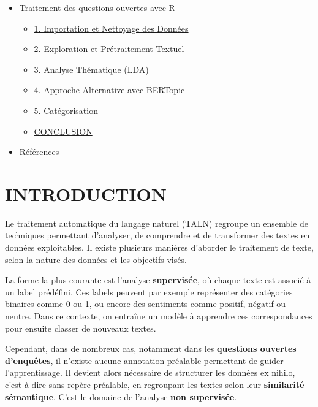 \documentclass[
]{article}
\providecommand{\tightlist}{%
  \setlength{\itemsep}{0pt}\setlength{\parskip}{0pt}}
\begin{document}
\begin{itemize}
\tightlist
\item
  \hyperref[analyse-textuelle-reponses-enquete]{Traitement des questions
  ouvertes avec R}

  \begin{itemize}
  \tightlist
  \item
    \hyperref[importation-nettoyage-donnees]{1. Importation et Nettoyage
    des Données}
  \item
    \hyperref[exploration-pretraitement-textuel]{2. Exploration et
    Prétraitement Textuel}
  \item
    \hyperref[analyse-thematique-lda]{3. Analyse Thématique (LDA)}
  \item
    \hyperref[approche-alternative-bertopic]{4. Approche Alternative
    avec BERTopic}
  \item
    \hyperref[visualisation]{5. Catégorisation}
  \item
    \hyperref[conclusion]{CONCLUSION}
  \end{itemize}
\item
  \hyperref[references-webographiques]{Références}
\end{itemize}

\newpage

\section{INTRODUCTION}\label{sec:importation}

Le traitement automatique du langage naturel (TALN) regroupe un ensemble
de techniques permettant d'analyser, de comprendre et de transformer des
textes en données exploitables. Il existe plusieurs manières d'aborder
le traitement de texte, selon la nature des données et les objectifs
visés.

La forme la plus courante est l'analyse \textbf{supervisée}, où chaque
texte est associé à un label prédéfini. Ces labels peuvent par exemple
représenter des catégories binaires comme 0 ou 1, ou encore des
sentiments comme positif, négatif ou neutre. Dans ce contexte, on
entraîne un modèle à apprendre ces correspondances pour ensuite classer
de nouveaux textes.

Cependant, dans de nombreux cas, notamment dans les \textbf{questions
ouvertes d'enquêtes}, il n'existe aucune annotation préalable permettant
de guider l'apprentissage. Il devient alors nécessaire de structurer les
données ex nihilo, c'est-à-dire sans repère préalable, en regroupant les
textes selon leur \textbf{similarité sémantique}. C'est le domaine de
l'analyse \textbf{non supervisée}.
\end{document}
